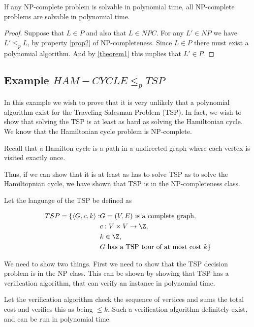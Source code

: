 \documentclass[10pt]{article}
\begin{document}
\begin{theorem}
If any NP-complete problem is solvable in polynomial time, all NP-complete problems are solvable in polynomial time.
\end{theorem}

\begin{proof}
  Suppose that $L \in P$ and also that $L \in NPC$. For any $L' \in NP$ we have $L' \leq_p L$, by property \ref{prop2} of NP-completeness. Since $L \in P$ there must exist a polynomial algorithm. And by \ref{theorem1} this implies that $L' \in P$.
\end{proof}



\subsection{Example $HAM-CYCLE \leq_p TSP$} %
\label{sub:subsection_name}
In this example we wish to prove that it is very unlikely that a polynomial algorithm exist for the Traveling Salesman Problem (TSP). In fact, we wish to show that solving the TSP is at least as hard as solving the Hamiltonian cycle. We know that the Hamiltonian cycle problem is NP-complete. 

Recall that a Hamilton cycle is a path in a undirected graph where each vertex is visited exactly once.

Thus, if we can show that it is at least as has to solve TSP as to solve the Hamiltopnian cycle, we have shown that TSP is in the NP-completeness class. 

Let the language of the TSP be defined as

\begin{align*}
TSP = \{\langle G, c, k \rangle : & G = (V,E) \text{ is a complete graph}, \\ 
                                  & c:V \times V \rightarrow \Z, \\
                                  & k \in \Z, \\
                                  & \text{$G$ has a TSP tour of at most cost $k$}\}
\end{align*}


We need to show two things. First we need to show that the TSP decision problem is in the NP class. This can be shown by showing that TSP has a verification algorithm, that can verify an instance in polynomial time. 

Let the verification algorithm check the sequence of vertices and sums the total cost and verifies this as being $\leq k$. Such a verification algorithm definitely exist, and can be run in polynomial time.
\end{document}
